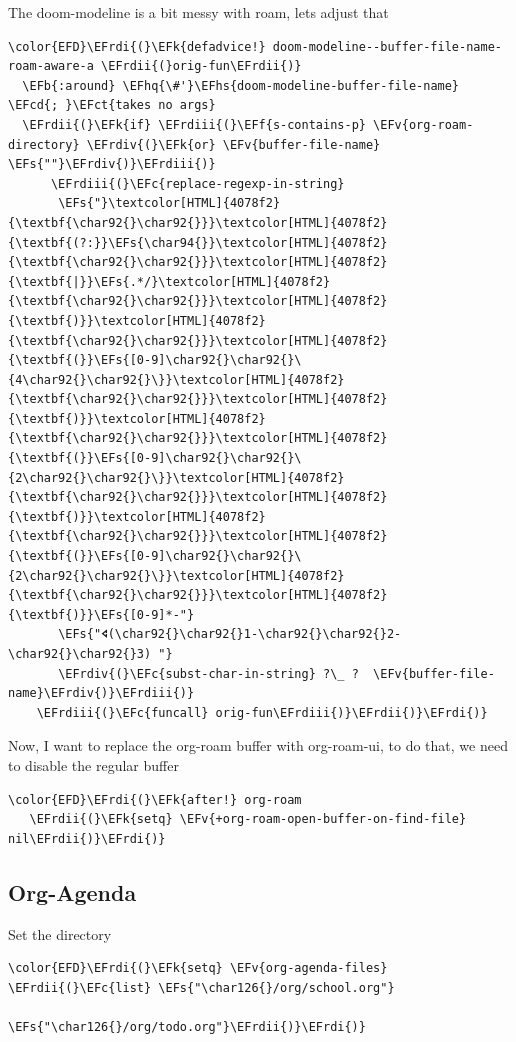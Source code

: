 \documentclass{scrartcl}
\newcommand{\EFk}[1]{\textcolor{EFk}{#1}} %
\newcommand{\EFs}[1]{\textcolor{EFs}{#1}} %
\newcommand{\EFb}[1]{\textcolor{EFb}{#1}} %
\newcommand{\EFct}[1]{\textcolor{EFct}{#1}} %
\newcommand{\EFc}[1]{\textcolor{EFc}{#1}} %
\newcommand{\EFv}[1]{\textcolor{EFv}{#1}} %
\newcommand{\EFf}[1]{\textcolor{EFf}{#1}} %
\newcommand{\EFcd}[1]{\textcolor{EFcd}{#1}} %
\newcommand{\EFhq}[1]{\textcolor{EFhq}{#1}} %
\newcommand{\EFhs}[1]{\textcolor{EFhs}{#1}} %
\newcommand{\EFrdi}[1]{\textcolor{EFrdi}{#1}} %
\newcommand{\EFrdii}[1]{\textcolor{EFrdii}{#1}} %
\newcommand{\EFrdiii}[1]{\textcolor{EFrdiii}{#1}} %
\newcommand{\EFrdiv}[1]{\textcolor{EFrdiv}{#1}} %
\begin{document}
The doom-modeline is a bit messy with roam, lets adjust that
\begin{Code}
\begin{Verbatim}[]
\color{EFD}\EFrdi{(}\EFk{defadvice!} doom-modeline--buffer-file-name-roam-aware-a \EFrdii{(}orig-fun\EFrdii{)}
  \EFb{:around} \EFhq{\#'}\EFhs{doom-modeline-buffer-file-name} \EFcd{; }\EFct{takes no args}
  \EFrdii{(}\EFk{if} \EFrdiii{(}\EFf{s-contains-p} \EFv{org-roam-directory} \EFrdiv{(}\EFk{or} \EFv{buffer-file-name} \EFs{""}\EFrdiv{)}\EFrdiii{)}
      \EFrdiii{(}\EFc{replace-regexp-in-string}
       \EFs{"}\textcolor[HTML]{4078f2}{\textbf{\char92{}\char92{}}}\textcolor[HTML]{4078f2}{\textbf{(?:}}\EFs{\char94{}}\textcolor[HTML]{4078f2}{\textbf{\char92{}\char92{}}}\textcolor[HTML]{4078f2}{\textbf{|}}\EFs{.*/}\textcolor[HTML]{4078f2}{\textbf{\char92{}\char92{}}}\textcolor[HTML]{4078f2}{\textbf{)}}\textcolor[HTML]{4078f2}{\textbf{\char92{}\char92{}}}\textcolor[HTML]{4078f2}{\textbf{(}}\EFs{[0-9]\char92{}\char92{}\{4\char92{}\char92{}\}}\textcolor[HTML]{4078f2}{\textbf{\char92{}\char92{}}}\textcolor[HTML]{4078f2}{\textbf{)}}\textcolor[HTML]{4078f2}{\textbf{\char92{}\char92{}}}\textcolor[HTML]{4078f2}{\textbf{(}}\EFs{[0-9]\char92{}\char92{}\{2\char92{}\char92{}\}}\textcolor[HTML]{4078f2}{\textbf{\char92{}\char92{}}}\textcolor[HTML]{4078f2}{\textbf{)}}\textcolor[HTML]{4078f2}{\textbf{\char92{}\char92{}}}\textcolor[HTML]{4078f2}{\textbf{(}}\EFs{[0-9]\char92{}\char92{}\{2\char92{}\char92{}\}}\textcolor[HTML]{4078f2}{\textbf{\char92{}\char92{}}}\textcolor[HTML]{4078f2}{\textbf{)}}\EFs{[0-9]*-"}
       \EFs{"🢔(\char92{}\char92{}1-\char92{}\char92{}2-\char92{}\char92{}3) "}
       \EFrdiv{(}\EFc{subst-char-in-string} ?\_ ?  \EFv{buffer-file-name}\EFrdiv{)}\EFrdiii{)}
    \EFrdiii{(}\EFc{funcall} orig-fun\EFrdiii{)}\EFrdii{)}\EFrdi{)}
\end{Verbatim}
\end{Code}


Now, I want to replace the org-roam buffer with org-roam-ui, to do that, we need
to disable the regular buffer
\begin{Code}
\begin{Verbatim}[]
\color{EFD}\EFrdi{(}\EFk{after!} org-roam
   \EFrdii{(}\EFk{setq} \EFv{+org-roam-open-buffer-on-find-file} nil\EFrdii{)}\EFrdi{)}
\end{Verbatim}
\end{Code}

\subsection{Org-Agenda}
\label{sec:org4ba5e55}
Set the directory
\begin{Code}
\begin{Verbatim}[]
\color{EFD}\EFrdi{(}\EFk{setq} \EFv{org-agenda-files} \EFrdii{(}\EFc{list} \EFs{"\char126{}/org/school.org"}
                             \EFs{"\char126{}/org/todo.org"}\EFrdii{)}\EFrdi{)}
\end{Verbatim}
\end{Code}
\end{document}
